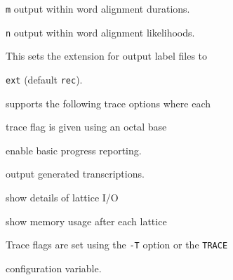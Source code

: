 \begin{optlist}
         \texttt{m} output within word alignment durations.


         \texttt{n} output within word alignment likelihoods.





    This sets the extension for output label files to


        \texttt{ext} (default \texttt{rec}).





\stdoptF


\stdoptG


\stdoptH


\stdoptI


\stdoptJ


\stdoptK


\stdoptP





\end{optlist}












 supports the following trace options where each


trace flag is given using an octal base


\begin{optlist}


    enable basic progress reporting.  


    output generated transcriptions.


    show details of lattice I/O


    show memory usage after each lattice


\end{optlist}


Trace flags are set using the \texttt{-T} option or the \texttt{TRACE} 


configuration variable.



















